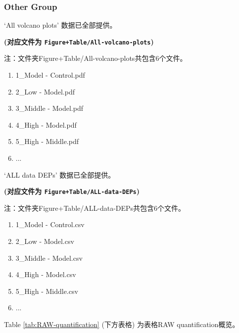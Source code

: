 \documentclass[
]{article}
\providecommand{\tightlist}{%
  \setlength{\itemsep}{0pt}\setlength{\parskip}{0pt}}
\begin{document}
\hypertarget{groups}{%
\subsubsection{Other Group}\label{groups}}

`All volcano plots' 数据已全部提供。

\textbf{(对应文件为 \texttt{Figure+Table/All-volcano-plots})}

\begin{center}\begin{tcolorbox}[colback=gray!10, colframe=gray!50, width=0.9\linewidth, arc=1mm, boxrule=0.5pt]注：文件夹Figure+Table/All-volcano-plots共包含6个文件。

\begin{enumerate}\tightlist
\item 1\_Model - Control.pdf
\item 2\_Low - Model.pdf
\item 3\_Middle - Model.pdf
\item 4\_High - Model.pdf
\item 5\_High - Middle.pdf
\item ...
\end{enumerate}\end{tcolorbox}
\end{center}

`ALL data DEPs' 数据已全部提供。

\textbf{(对应文件为 \texttt{Figure+Table/ALL-data-DEPs})}

\begin{center}\begin{tcolorbox}[colback=gray!10, colframe=gray!50, width=0.9\linewidth, arc=1mm, boxrule=0.5pt]注：文件夹Figure+Table/ALL-data-DEPs共包含6个文件。

\begin{enumerate}\tightlist
\item 1\_Model - Control.csv
\item 2\_Low - Model.csv
\item 3\_Middle - Model.csv
\item 4\_High - Model.csv
\item 5\_High - Middle.csv
\item ...
\end{enumerate}\end{tcolorbox}
\end{center}

Table \ref{tab:RAW-quantification} (下方表格) 为表格RAW quantification概览。
\end{document}

